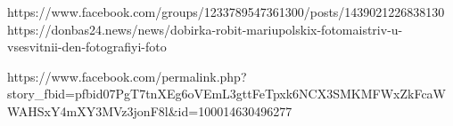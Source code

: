  
 
 
 
 

https://www.facebook.com/groups/1233789547361300/posts/1439021226838130
https://donbas24.news/news/dobirka-robit-mariupolskix-fotomaistriv-u-vsesvitnii-den-fotografiyi-foto


https://www.facebook.com/permalink.php?story_fbid=pfbid07PgT7tnXEg6oVEmL3gttFeTpxk6NCX3SMKMFWxZkFcaWWAHSxY4mXY3MVz3jonF8l&id=100014630496277

